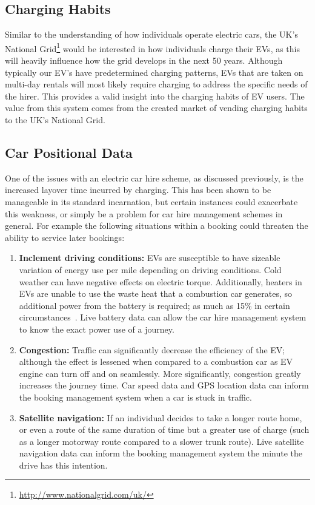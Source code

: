 \documentclass[journal]{IEEEtran}
\begin{document}
\subsection{Charging Habits}

Similar to the understanding of how individuals operate electric cars,
the UK's National Grid\footnote{\url{http://www.nationalgrid.com/uk/}}
would be interested in how individuals charge their EVs, as this will
heavily influence how the grid develops in the next 50 years.
Although typically our EV's have predetermined charging patterns, EVs
that are taken on multi-day rentals will most likely require charging
to address the specific needs of the hirer. This provides a valid
insight into the charging habits of EV users. The value from this
system comes from the created market of vending charging habits to the
UK's National Grid.


\subsection{Car Positional Data}

One of the issues with an electric car hire scheme, as discussed
previously, is the increased layover time incurred by charging. This
has been shown to be manageable in its standard incarnation, but
certain instances could exacerbate this weakness, or simply be a
problem for car hire management schemes in general. For example the
following situations within a booking could threaten the ability to
service later bookings:

\begin{enumerate}
\item {\textbf{Inclement driving conditions:}} EVs are susceptible to
  have sizeable variation of energy use per mile depending on driving
  conditions. Cold weather can have negative effects on electric
  torque. Additionally, heaters in EVs are unable to use the waste
  heat that a combustion car generates, so additional power from the
  battery is required; as much as 15\% in certain
  circumstances~\cite{postevs:2010}. Live
  battery data can allow the car hire management system to know the
  exact power use of a journey.
\item {\textbf{Congestion:}} Traffic can significantly decrease the
  efficiency of the EV; although the effect is lessened when compared
  to a combustion car as EV engine can turn off and on
  seamlessly. More significantly, congestion greatly increases the
  journey time. Car speed data and GPS location data can inform the
  booking management system when a car is stuck in traffic.
\item {\textbf{Satellite navigation:}} If an individual decides to take a longer
  route home, or even a route of the same duration of time but a
  greater use of charge (such as a longer motorway route compared to a
  slower trunk route). Live satellite navigation data can inform the booking
  management system the minute the drive has this intention. 
\end{enumerate}
\end{document}
